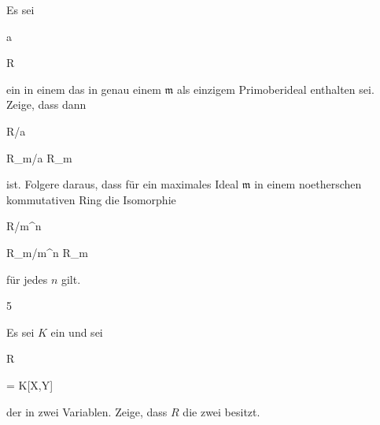 {


Es sei


\mavergleichskette

{\vergleichskette

{ {\mathfrak a}
}

{ \subseteq }{ R
}

{  }{
}

{    }{
}

{   }{
}

}
{}{}{}
ein
in einem
das in genau einem
${\mathfrak m}$ als einzigem Primoberideal enthalten sei. Zeige, dass dann


\mavergleichskette

{\vergleichskette

{ R/{\mathfrak a}
}

{ \cong }{ R_{\mathfrak m}/{\mathfrak a} R_{\mathfrak m}
}

{  }{
}

{    }{
}

{   }{
}

}
{}{}{}
ist. Folgere daraus, dass für ein maximales Ideal ${\mathfrak m}$ in einem noetherschen kommutativen Ring die Isomorphie


\mavergleichskette

{\vergleichskette

{ R/{\mathfrak m}^n
}

{ \cong }{ R_{\mathfrak m}/{\mathfrak m}^n  R_{\mathfrak m}
}

{  }{
}

{    }{
}

{   }{
}

}
{}{}{}
für jedes $n$ gilt.


}

{} {}



{5}

{


Es sei $K$ ein
und sei


\mavergleichskette

{\vergleichskette

{ R
}

{ = }{ K[X,Y]
}

{  }{
}

{    }{
}

{   }{
}

}
{}{}{}
der
in zwei Variablen. Zeige, dass $R$ die
zwei besitzt.


}

